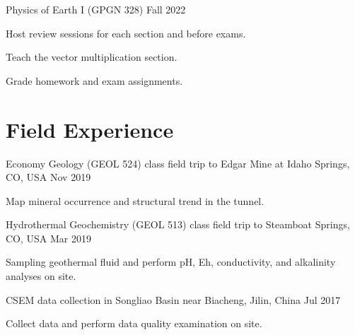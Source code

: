 \documentclass[paper=a4,fontsize=11pt]{scrartcl} %
\newcommand{\sepspace}{\vspace*{0.5em}}		%
\newcommand{\NewPart}[1]{\section*{{#1}}}
\begin{document}
\hspace{0em} Physics of Earth I (GPGN 328)  \hspace{26.9em} Fall 2022

\hspace{0em} \textbullet \hspace{1em} Host review sessions for each section and before exams.

\hspace{0em} \textbullet \hspace{1em} Teach the vector multiplication section.

\hspace{0em} \textbullet \hspace{1em} Grade homework and exam assignments.

\sepspace




\NewPart{Field Experience}{}
\hspace{1em} Economy Geology (GEOL 524) class field trip to Edgar Mine at Idaho Springs, CO, USA \hspace{1.6em} Nov 2019

\hspace{0em} \textbullet \hspace{1em} Map mineral occurrence and structural trend in the tunnel.

\hspace{0em} Hydrothermal Geochemistry (GEOL 513) class field trip to Steamboat Springs, CO, USA \hspace{1.3em} Mar 2019

\hspace{0em} \textbullet \hspace{1em} Sampling geothermal fluid and perform pH, Eh, conductivity, and alkalinity analyses on site.

\hspace{0em} CSEM data collection in Songliao Basin near Biacheng, Jilin, China  \hspace{11.2em} Jul 2017

\hspace{0em} \textbullet \hspace{1em} Collect data and perform data quality examination on site.

\sepspace
\end{document}
